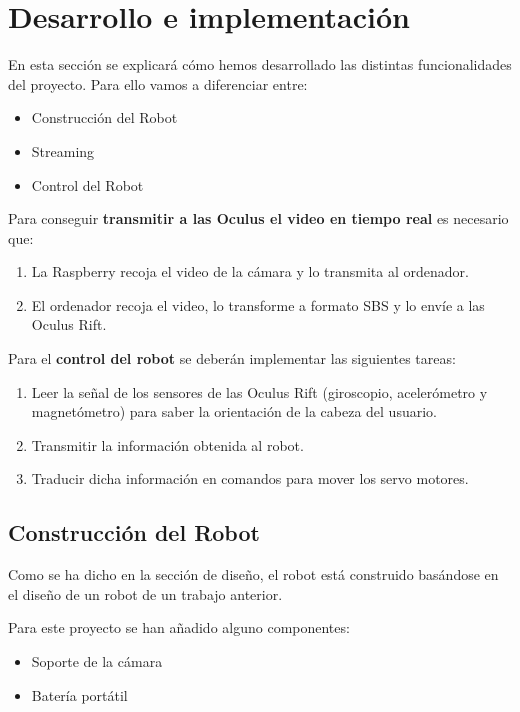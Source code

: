 \documentclass[twoside, 12pt]{epstfg}
\begin{document}
\newpage
\section{Desarrollo e implementación}
En esta sección se explicará cómo hemos desarrollado las distintas funcionalidades del proyecto.
Para ello vamos a diferenciar entre:

\begin{itemize}
	\item Construcción del Robot
	\item Streaming 
	\item Control del Robot
\end{itemize}

Para conseguir \textbf{transmitir a las Oculus el video en tiempo real} es necesario que:
\begin{enumerate}
	\item La Raspberry recoja el video de la cámara y lo transmita al ordenador.
	
	\item El ordenador recoja el video, lo transforme a formato SBS y lo envíe a las Oculus Rift. 
	
\end{enumerate}





Para el \textbf{control del robot} se deberán implementar las siguientes tareas:

\begin{enumerate}
	\item Leer la señal de los sensores de las Oculus Rift (giroscopio, acelerómetro y magnetómetro) para saber la orientación de la cabeza del usuario.
	
	\item Transmitir la información obtenida al robot.
	
	\item Traducir dicha información en comandos para mover los servo motores.
\end{enumerate} 
\subsection{Construcción del Robot}
Como se ha dicho en la sección de diseño, el robot está construido basándose en el diseño de un robot de un trabajo anterior.

Para este proyecto se han añadido alguno componentes:

\begin{itemize}
	\item Soporte de la cámara
	\item Batería portátil
\end{itemize}
\end{document}
